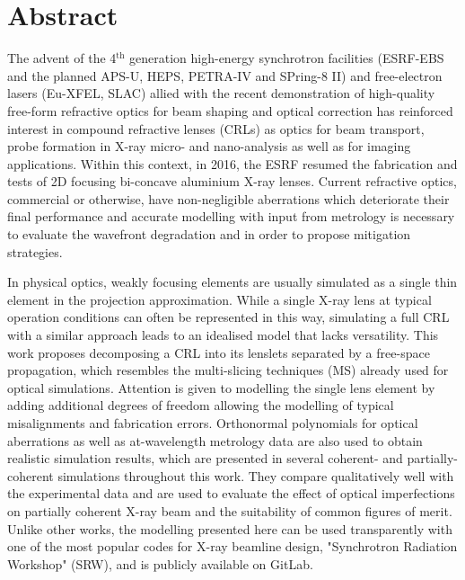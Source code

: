 \chapter*{Abstract}
\label{sec:abstractEN}
\vspace*{-10mm}

The advent of the 4$^{\text{th}}$ generation high-energy synchrotron facilities (ESRF-EBS and the planned APS-U, HEPS, PETRA-IV and SPring-8 II) and free-electron lasers (Eu-XFEL, SLAC) allied with the recent demonstration of high-quality free-form refractive optics for beam shaping and optical correction has reinforced interest in compound refractive lenses (CRLs) as optics for beam transport, probe formation in X-ray micro- and nano-analysis as well as for imaging applications. Within this context, in 2016, the ESRF resumed the fabrication and tests of 2D focusing bi-concave aluminium X-ray lenses. Current refractive optics, commercial or otherwise, have non-negligible aberrations which deteriorate their final performance and accurate modelling with input from metrology is necessary to evaluate the wavefront degradation and in order to propose mitigation strategies.

In physical optics, weakly focusing elements are usually simulated as a single thin element in the projection approximation. While a single X-ray lens at typical operation conditions can often be represented in this way, simulating a full CRL with a similar approach leads to an idealised model that lacks versatility. This work proposes decomposing a CRL into its lenslets separated by a free-space propagation, which resembles the multi-slicing techniques (MS) already used for optical simulations. Attention is given to modelling the single lens element by adding additional degrees of freedom allowing the modelling of typical misalignments and fabrication errors. Orthonormal polynomials for optical aberrations as well as at-wavelength metrology data are also used to obtain realistic simulation results, which are presented in several coherent- and partially-coherent simulations throughout this work. They compare qualitatively well with the experimental data and are used to evaluate the effect of optical imperfections on partially coherent X-ray beam and the suitability of common figures of merit. Unlike other works, the modelling presented here can be used transparently with one of the most popular codes for X-ray beamline design, "Synchrotron Radiation Workshop" (SRW), and is publicly available on GitLab.

